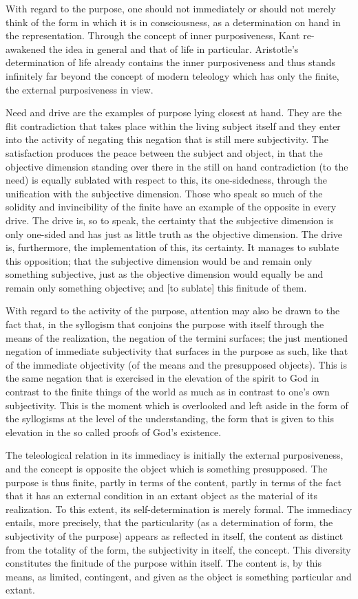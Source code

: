 With regard to the purpose,
one should not immediately
or should not merely think of
the form in which it is in consciousness,
as a determination on hand in the representation.
Through the concept of inner purposiveness,
Kant re-awakened the idea in general
and that of life in particular.
Aristotle's determination of life
already contains the inner purposiveness
and thus stands infinitely far beyond
the concept of modern teleology
which has only the finite,
the external purposiveness in view.

Need and drive are the examples of purpose lying closest at hand.
They are the flit contradiction that takes place within the living
subject itself and they enter into the activity of negating this
negation that is still mere subjectivity.
The satisfaction produces the peace between the subject and object,
in that the objective dimension standing over there
in the still on hand contradiction (to the need)
is equally sublated with respect to this, its one-sidedness,
through the unification with the subjective dimension.
Those who speak so much of the solidity and invincibility of
the finite have an example of the opposite in every drive.
The drive is, so to speak, the certainty that
the subjective dimension is only one-sided
and has just as little truth as the objective dimension.
The drive is, furthermore, the implementation of this, its certainty.
It manages to sublate this opposition;
that the subjective dimension
would be and remain only something subjective,
just as the objective dimension
would equally be and remain only something objective;
and [to sublate] this finitude of them.

With regard to the activity of the purpose,
attention may also be drawn to the fact that,
in the syllogism that conjoins the purpose with itself
through the means of the realization,
the negation of the termini surfaces;
the just mentioned negation of immediate subjectivity
that surfaces in the purpose as such,
like that of the immediate objectivity
(of the means and the presupposed objects).
This is the same negation that is exercised
in the elevation of the spirit to God
in contrast to the finite things of the world
as much as in contrast to one's own subjectivity.
This is the moment which is overlooked
and left aside in the form of the syllogisms
at the level of the understanding,
the form that is given to this elevation
in the so called proofs of God's existence.

The teleological relation in its immediacy is
initially the external purposiveness,
and the concept is opposite the object
which is something presupposed.
The purpose is thus finite,
partly in terms of the content,
partly in terms of the fact that
it has an external condition in an extant object
as the material of its realization.
To this extent, its self-determination is merely formal.
The immediacy entails, more precisely, that the particularity
(as a determination of form, the subjectivity of the purpose)
appears as reflected in itself,
the content as distinct from the totality of the form,
the subjectivity in itself, the concept.
This diversity constitutes the finitude of
the purpose within itself.
The content is, by this means,
as limited, contingent, and given
as the object is something particular and extant.

